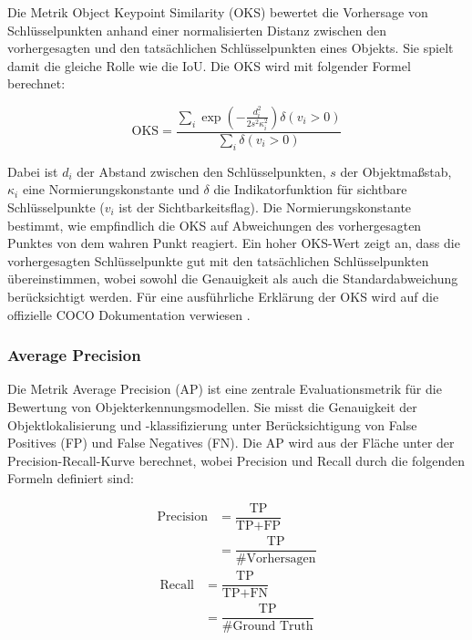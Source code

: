 Die Metrik Object Keypoint Similarity (OKS) bewertet die Vorhersage von Schlüsselpunkten anhand einer normalisierten Distanz zwischen den vorhergesagten und den tatsächlichen Schlüsselpunkten eines Objekts. Sie spielt damit die gleiche Rolle wie die IoU. Die OKS wird mit folgender Formel berechnet:

\begin{equation}
    \text{OKS} = \frac{{\sum_{i}{\exp\left(-\frac{{d_i^2}}{{2s^2\kappa_i^2}}\right)\delta(v_i > 0)}}}{{\sum_{i}{\delta(v_i > 0)}}}
\end{equation}


Dabei ist \(d_i \) der Abstand zwischen den Schlüsselpunkten, \(s \) der Objektmaßstab, \(\kappa_i \) eine Normierungskonstante und \(\delta \) die Indikatorfunktion für sichtbare Schlüsselpunkte (\(v_i\) ist der Sichtbarkeitsflag). Die Normierungskonstante bestimmt, wie empfindlich die OKS auf Abweichungen des vorhergesagten Punktes von dem wahren Punkt reagiert.
Ein hoher OKS-Wert zeigt an, dass die vorhergesagten Schlüsselpunkte gut mit den tatsächlichen Schlüsselpunkten übereinstimmen, wobei sowohl die Genauigkeit als auch die Standardabweichung berücksichtigt werden.
Für eine ausführliche Erklärung der OKS wird auf die offizielle COCO Dokumentation verwiesen \cite{coco}.
\subsubsection{Average Precision}
Die Metrik Average Precision (AP) ist eine zentrale Evaluationsmetrik für die Bewertung von Objekterkennungsmodellen. Sie misst die Genauigkeit der Objektlokalisierung und -klassifizierung unter Berücksichtigung von False Positives (FP) und False Negatives (FN). Die AP wird aus der Fläche unter der Precision-Recall-Kurve berechnet, wobei Precision und Recall durch die folgenden Formeln definiert sind:

\begin{multicols}{2}
\begin{equation}    
\begin{aligned}
    \text{Precision}&=\dfrac{\text{TP}}{\text{TP}+\text{FP}}\\
        &=\dfrac{\text{TP}}{\text{\#Vorhersagen}}
\end{aligned}
\label{eq:precision}
\end{equation}\break
\begin{equation}    
\begin{aligned}
    \text{Recall}&=\dfrac{\text{TP}}{\text{TP}+\text{FN}}\\
        &=\dfrac{\text{TP}}{\text{\#Ground Truth}}
\end{aligned}
\label{eq:recall}
\end{equation}
\end{multicols}

